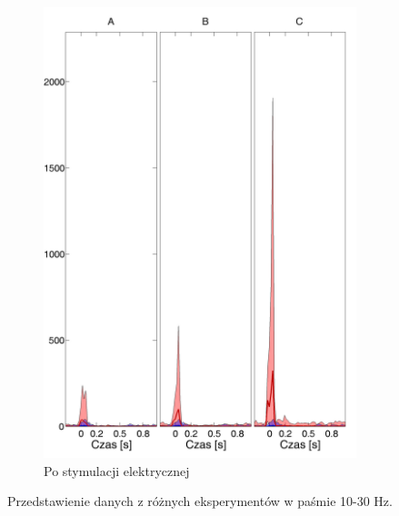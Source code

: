 \documentclass{pracamgr_2}
\begin{document}
\begin{figure}[h]
\begin{subfigure}{.5\textwidth}
			\includegraphics[width=1.\linewidth]{beta3_10-30_z_CxC5_do_SC42.png}
			\caption{Po stymulacji elektrycznej}
			\label{rys:10_30_beta_CxC_SC}
		\end{subfigure}
		\caption{Przedstawienie danych z różnych eksperymentów w paśmie 10-30 Hz.}
		\label{rys:10_30_CxC_SC}
	\end{figure}
\end{document}

